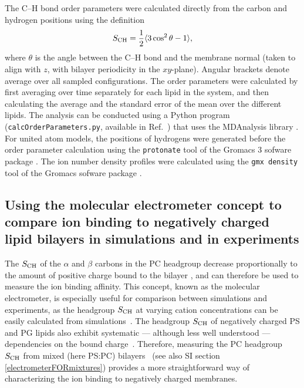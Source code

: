 \documentclass[journal=jpcbfk,manuscript=article]{achemso}
\begin{document}



The C--H bond order parameters were calculated directly
from the carbon and hydrogen positions using the definition
\begin{equation}
S_{\rm CH}=\frac{1}{2}\langle 3\cos^2\theta -1 \rangle,
\end{equation}
where $\theta$ is the angle between the C--H bond and the membrane normal
(taken to align with $z$, with bilayer periodicity in the $xy$-plane).
Angular brackets denote average over all sampled configurations.
The order parameters were calculated by first averaging over time separately
for each lipid in the system, and then calculating the average and
the standard error of the mean over the different lipids. The analysis can be conducted using a
Python program ({\tt calcOrderParameters.py}, available in Ref.~) that uses the
MDAnalysis library \cite{agrawal11,gowers16}.
For united atom models, the positions of hydrogens were generated before the order parameter calculation using the {\tt protonate} tool
of the Gromacs 3 sofware package \cite{gromacsMANUAL}.
The ion number density profiles were calculated using the {\tt gmx density} tool
of the Gromacs sofware package \cite{gromacsMANUAL}.

\subsection{Using the molecular electrometer concept to compare ion binding to negatively charged lipid bilayers 
in simulations and in experiments}

The $S_{\rm CH}$ of the $\alpha$ and $\beta$ carbons in the PC headgroup
decrease proportionally to the amount of positive
charge bound to the bilayer \cite{akutsu81,altenbach84,seelig87},
and can therefore be used to measure the ion binding affinity.
This concept, known as the molecular electrometer, is especially useful for 
comparison between simulations and experiments, as
the headgroup $S_{\rm CH}$ at varying cation
concentrations can be easily calculated from
simulations~\cite{catte16}. The headgroup $S_{\rm CH}$
of negatively charged PS and PG lipids also exhibit systematic --- although less well understood ---dependencies on the bound charge~\cite{borle85,macdonald87,roux86,roux90}.
Therefore, measuring the PC headgroup $S_{\rm CH}$ from 
mixed (here PS:PC) bilayers~\cite{roux86,roux90,roux91} (see also SI section \ref{electrometerFORmixtures}) provides a more straightforward way of characterizing the ion binding to negatively charged membranes.
\end{document}
